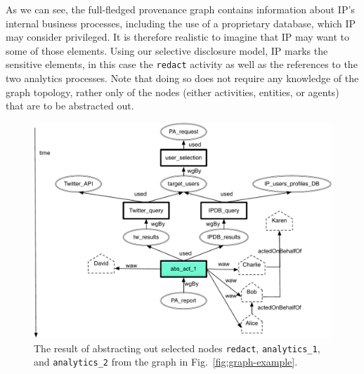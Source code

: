 As we can see, the full-fledged provenance graph contains information about IP's internal business processes, including the use of a proprietary database, which IP may consider privileged.
It is therefore realistic to imagine that IP may want to  some of those elements. 
Using our selective disclosure model, IP marks the sensitive elements, in this case the \texttt{redact} activity as well as the references to the two analytics processes. Note that doing so does not require any knowledge of the graph topology, rather only of the nodes (either activities, entities, or agents) that are to be abstracted out.


	\begin{figure}
		\begin{center}
			\includegraphics[width=.9\textwidth]{figures/analytics-ex-abs1-FGCS-paper}
			\caption{The result of abstracting out selected nodes \texttt{redact},  \texttt{analytics\_1}, and  \texttt{analytics\_2}  from the graph in Fig.~\ref{fig:graph-example}.} 
			\label{fig:graph-example-abs-1}
		\end{center}
	\end{figure}	
	
